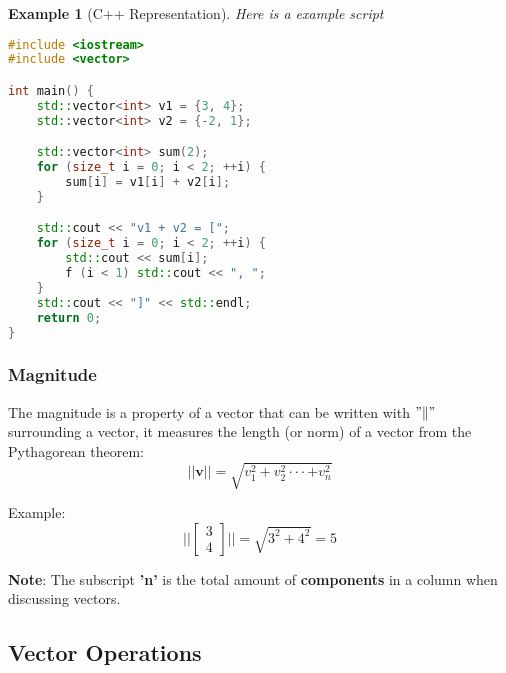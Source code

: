 \documentclass[12pt]{article}
\newtheorem{example}{Example}[section]
\begin{document}
            \begin{example}[C++ Representation] 
            Here is a example script
            \begin{lstlisting}[language=C++]
#include <iostream>
#include <vector>

int main() {
    std::vector<int> v1 = {3, 4};
    std::vector<int> v2 = {-2, 1};

    std::vector<int> sum(2);
    for (size_t i = 0; i < 2; ++i) {
        sum[i] = v1[i] + v2[i];
    }

    std::cout << "v1 + v2 = [";
    for (size_t i = 0; i < 2; ++i) {
        std::cout << sum[i];
        f (i < 1) std::cout << ", ";
    }
    std::cout << "]" << std::endl;
    return 0;
}
            \end{lstlisting}
            \end{example}

        \subsubsection{Magnitude}
            The magnitude is a property of a vector that can be written with $"\|"$ surrounding a vector, it measures the length (or norm) of a vector from the Pythagorean theorem:
            \begin{equation}
                ||\mathbf{v}|| = \sqrt{v^2_1 + v^2_2 \cdot\cdot\cdot + v^2_n}
            \end{equation}

            Example:
            \begin{equation}
                ||\begin{bmatrix} 3 \\ 4 \end{bmatrix}|| = \sqrt{3^2 + 4^2} = 5
            \end{equation}

            \textbf{Note}: The subscript \textbf{'n'} is the total amount of \textbf{components} in a column when discussing vectors.

    \subsection{Vector Operations}
\end{document}
